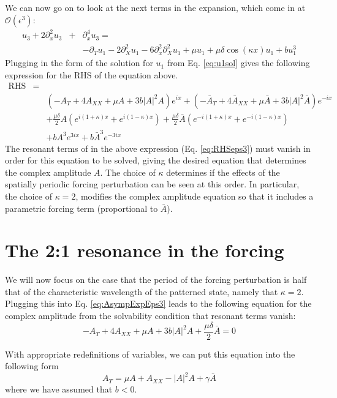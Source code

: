 \documentclass[api,pof,pre,12pt,a4paper]{revtex4-1}
\begin{document}
We can now go on to look at the next terms in the expansion, which come in at $\mathcal{O}(\epsilon^3)$:
\begin{eqnarray}
u_3+2\partial_x^2 u_3 &+& \partial_x^4 u_3 =  \nonumber \\
& & -\partial_T u_1-2\partial_X^2 u_1 - 6\partial_x^2 \partial_X^2 u_1 +\mu u_1 +\mu \delta \cos(\kappa x)  u_1 +b u_1^3
\label{eq:AsympExpEps3}
\end{eqnarray}
Plugging in the form of the solution for $u_1$ from Eq. \ref{eq:u1sol} gives the following expression for the RHS of the equation above.
\begin{eqnarray}
\text{RHS}&=&  \nonumber \\ 
& &\left(-A_T  +4 A_{XX}+\mu A + 3b |A|^2 A\right)e^{ix} + \left(-\bar{A}_T +4 \bar{A}_{XX}+\mu \bar{A} + 3b |A|^2 \bar{A}\right)e^{-ix} \nonumber \\
& &+\frac{\mu\delta}{2} A\left(e^{i(1+\kappa)x}+e^{i(1-\kappa)x} \right) + \frac{\mu\delta}{2} \bar{A}\left( e^{-i(1+\kappa)x}+e^{-i(1-\kappa)x} \right) \nonumber \\
& & +bA^3e^{3ix}+b\bar{A}^3e^{-3ix}
\label{eq:RHSeps3}
\end{eqnarray}
The resonant terms of in the above expression (Eq. \ref{eq:RHSeps3}) must vanish in order for this equation to be solved, giving the desired equation that determines the complex amplitude $A$.  The choice of $\kappa$ determines if the effects of the spatially periodic forcing perturbation can be seen at this order.  In particular, the choice of $\kappa=2$, modifies the complex amplitude equation so that it includes a parametric forcing term (proportional to $\bar{A}$).

\section{The 2:1 resonance in the forcing}
We will now focus on the case that the period of the forcing perturbation is half that of the characteristic wavelength of the patterned state, namely that $\kappa=2$.  Plugging this into Eq. \ref{eq:AsympExpEps3} leads to the following equation for the complex amplitude from the solvability condition that resonant terms vanish:
\begin{equation}
-A_T  +4 A_{XX}+\mu A + 3b |A|^2 A+\frac{\mu\delta}{2}\bar{A}=0
\label{eq:LGEpf1}
\end{equation}

With appropriate redefinitions of variables, we can put this equation into the following form
\begin{equation}
A_T  = \mu A + A_{XX} - |A|^2 A+\gamma\bar{A}
\label{eq:LGEpf}
\end{equation}
where we have assumed that $b<0$.
\end{document}
